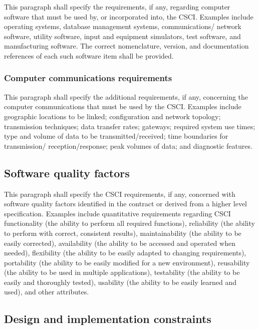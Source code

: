 This paragraph shall specify the requirements, if any, regarding
computer software that must be used by, or incorporated into, the CSCI.
Examples include operating systems, database management systems,
communications/ network software, utility software, input and equipment
simulators, test software, and manufacturing software. The correct
nomenclature, version, and documentation references of each such
software item shall be provided.

\subsubsection{Computer communications requirements}

This paragraph shall specify the additional requirements, if any,
concerning the computer communications that must be used by the CSCI.
Examples include geographic locations to be linked; configuration and
network topology; transmission techniques; data transfer rates;
gateways; required system use times; type and volume of data to be
transmitted/received; time boundaries for transmission/
reception/response; peak volumes of data; and diagnostic features.

\subsection{Software quality factors}

This paragraph shall specify the CSCI requirements, if any, concerned
with software quality factors identified in the contract or derived from
a higher level specification. Examples include quantitative requirements
regarding CSCI functionality (the ability to perform all required
functions), reliability (the ability to perform with correct, consistent
results), maintainability (the ability to be easily corrected),
availability (the ability to be accessed and operated when needed),
flexibility (the ability to be easily adapted to changing requirements),
portability (the ability to be easily modified for a new environment),
reusability (the ability to be used in multiple applications),
testability (the ability to be easily and thoroughly tested), usability
(the ability to be easily learned and used), and other attributes.

\subsection{Design and implementation constraints}


